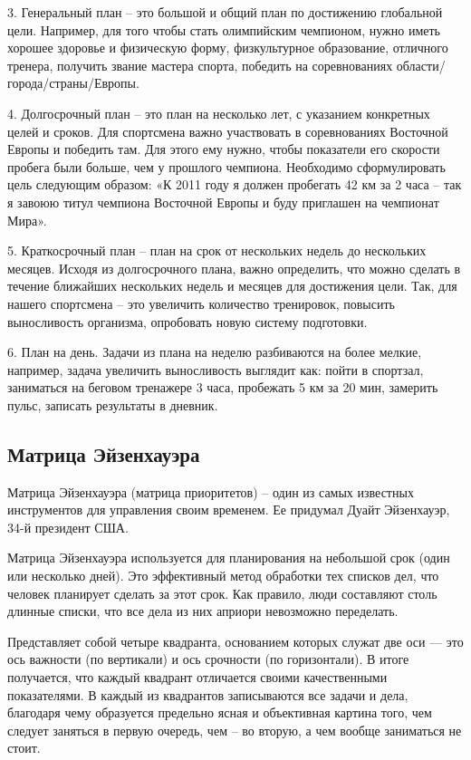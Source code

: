 3. Генеральный план – это большой и общий план по достижению глобальной цели. Например, для того чтобы стать олимпийским чемпионом, нужно иметь хорошее здоровье и физическую форму, физкультурное образование, отличного тренера, получить звание мастера спорта, победить на соревнованиях области/города/страны/Европы. 

4. Долгосрочный план – это план на несколько лет, с указанием конкретных целей и сроков. Для спортсмена важно участвовать в соревнованиях Восточной Европы и победить там. Для этого ему нужно, чтобы показатели его скорости пробега были больше, чем у прошлого чемпиона. Необходимо сформулировать цель следующим образом: «К 2011 году я должен пробегать 42 км за 2 часа – так я завоюю титул чемпиона Восточной Европы и буду приглашен на чемпионат Мира». 

5. Краткосрочный план – план на срок от нескольких недель до нескольких месяцев. Исходя из долгосрочного плана, важно определить, что можно сделать в течение ближайших нескольких недель и месяцев для достижения цели. Так, для нашего спортсмена – это увеличить количество тренировок, повысить выносливость организма, опробовать новую систему подготовки. 

6. План на день. Задачи из плана на неделю разбиваются на более мелкие, например, задача увеличить выносливость выглядит как: пойти в спортзал, заниматься на беговом тренажере 3 часа, пробежать 5 км за 20 мин, замерить пульс, записать результаты в дневник.

\subsection{Матрица Эйзенхауэра}
Матрица Эйзенхауэра (матрица приоритетов) – один из самых известных инструментов для управления своим временем. Ее придумал Дуайт Эйзенхауэр, 34-й президент США.

Матрица Эйзенхауэра используется для планирования на небольшой срок (один или несколько дней). Это эффективный метод обработки тех списков дел, что человек планирует сделать за этот срок. Как правило, люди составляют столь длинные списки, что все дела из них априори невозможно переделать.

Представляет собой четыре квадранта, основанием которых служат две оси — это ось важности (по вертикали) и ось срочности (по горизонтали). В итоге получается, что каждый квадрант отличается своими качественными показателями. В каждый из квадрантов записываются все задачи и дела, благодаря чему образуется предельно ясная и объективная картина того, чем следует заняться в первую очередь, чем – во вторую, а чем вообще заниматься не стоит.

